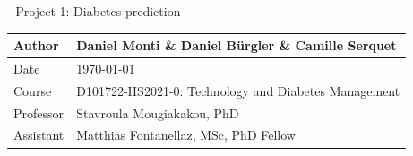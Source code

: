 \documentclass[11pt]{article}
\renewcommand{\arraystretch}{1.3}
\begin{document}
	\begin{titlepage}
		\thispagestyle{thetitlepage}
		\begin{center}
			\vspace*{2cm}
			
			\Huge{- Project 1: Diabetes prediction -}
			
			\vspace{0.5cm}
			
			\begin{table}[H]
				\renewcommand{\arraystretch}{1.3}
				\centering	
				\begin{tabular}{|l|l|}
					\hline
					\Large{Author} & \Large{Daniel Monti \& Daniel Bürgler \& Camille Serquet} \\
					\hline
					\Large{Date} & \Large{\today} \\
					\hline
					\Large{Course} & \Large{D101722-HS2021-0: Technology and Diabetes Management } \\
					\hline
					\Large{Professor} & \Large{Stavroula Mougiakakou, PhD} \\
					\hline
					\Large{Assistant} & \Large{Matthias Fontanellaz, MSc, PhD Fellow} \\
					\hline
				\end{tabular}
			\end{table}
		\end{center}
		\vspace{0.7cm}
		\tableofcontents		
	\end{titlepage}
	
	\pagestyle{theotherpages}
	
\end{document}
